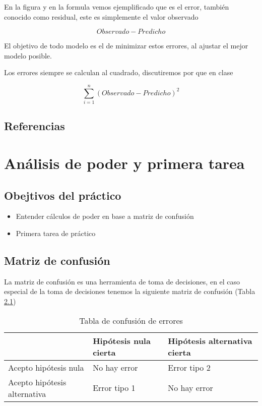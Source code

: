 \documentclass[]{book}
\providecommand{\tightlist}{%
  \setlength{\itemsep}{0pt}\setlength{\parskip}{0pt}}
\begin{document}
En la figura y en la formula vemos ejemplificado que es el error,
también conocido como residual, este es simplemente el valor observado

\[Observado - Predicho\]

El objetivo de todo modelo es el de minimizar estos errores, al ajustar
el mejor modelo posible.

Los errores siempre se calculan al cuadrado, discutiremos por que en
clase

\[\sum_{i=1}^{n} (Observado - Predicho)^2\]

\section{Referencias}\label{referencias}

\chapter{Análisis de poder y primera tarea}\label{Poder}

\section{Obejtivos del práctico}\label{obejtivos-del-practico}

\begin{itemize}
\tightlist
\item
  Entender cálculos de poder en base a matriz de confusión
\item
  Primera tarea de práctico
\end{itemize}

\section{Matriz de confusión}\label{matriz-de-confusion}

La matriz de confusión es una herramienta de toma de decisiones, en el
caso especial de la toma de decisiones tenemos la siguiente matriz de
confusión (Tabla \ref{tab:errores})

\begin{table}

\caption{\label{tab:errores}Tabla de confusión de errores}
\centering
\begin{tabular}[t]{l|l|l}
\hline
  & Hipótesis nula cierta & Hipótesis alternativa cierta\\
\hline
Acepto hipótesis nula & No hay error & Error tipo 2\\
\hline
Acepto hipótesis alternativa & Error tipo 1 & No hay error\\
\hline
\end{tabular}
\end{table}
\end{document}
